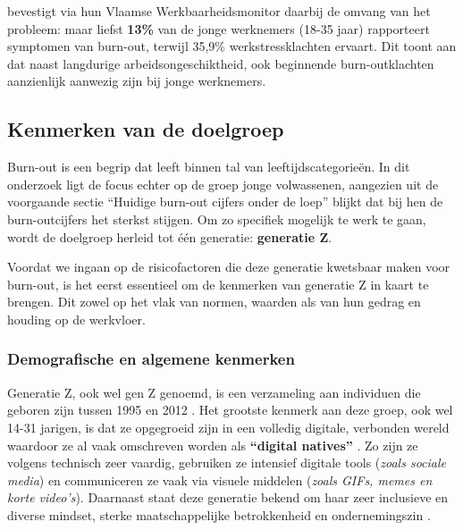 \vspace{1em}

\textcite{SERV2024_werkbaarwerk} bevestigt via hun Vlaamse Werkbaarheidsmonitor daarbij de omvang van het probleem: maar liefst \textbf{13\%} van de jonge werknemers (18-35 jaar) rapporteert symptomen van burn-out, terwijl 35,9\% werkstressklachten ervaart. Dit toont aan dat naast langdurige arbeidsongeschiktheid, ook beginnende burn-outklachten aanzienlijk aanwezig zijn bij jonge werknemers.

\vspace{1em}



\subsection{Kenmerken van de doelgroep}
\label{subsec:kenmerken-generatieZ}

\vspace{1em}

Burn-out is een begrip dat leeft binnen tal van leeftijdscategorieën. In dit onderzoek ligt de focus echter op de groep jonge volwassenen, aangezien uit de voorgaande sectie “Huidige burn-out cijfers onder de loep” blijkt dat bij hen de burn-outcijfers het sterkst stijgen. Om zo specifiek mogelijk te werk te gaan, wordt de doelgroep herleid tot één generatie: \textbf{generatie Z}.

\vspace{1em}

Voordat we ingaan op de risicofactoren die deze generatie kwetsbaar maken voor burn-out, is het eerst essentieel om de kenmerken van generatie Z in kaart te brengen. Dit zowel op het vlak van normen, waarden als van hun gedrag en houding op de werkvloer. 

\vspace{1em}

\subsubsection{Demografische en algemene kenmerken}
\label{subsubsec:demografic-z}

\vspace{1em}

Generatie Z, ook wel gen Z genoemd, is een verzameling aan individuen die geboren zijn tussen 1995 en 2012 \autocite{Cnossen2024}. Het grootste kenmerk aan deze groep, ook wel 14-31 jarigen, is dat ze opgegroeid zijn in een volledig digitale, verbonden wereld waardoor ze al vaak omschreven worden als \textbf{“digital natives”} \autocite{Peredy2024}. Zo zijn ze volgens \textcite{Peredy2024} technisch zeer vaardig, gebruiken ze intensief digitale tools (\textit{zoals sociale media}) en communiceren ze vaak via visuele middelen (\textit{zoals GIFs, memes en korte video’s}). Daarnaast staat deze generatie bekend om haar zeer inclusieve en diverse mindset, sterke maatschappelijke betrokkenheid en ondernemingszin \autocite{Peredy2024}.

